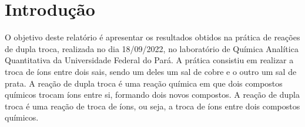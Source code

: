\documentclass[a4paper, 11pt]{article}
\begin{document}
\newpage
\section{Introdução}\label{sec:intro}
\indent O objetivo deste relatório é apresentar os resultados obtidos na prática de reações de dupla troca, realizada no dia 18/09/2022, no laboratório de Química Analítica Quantitativa da Universidade Federal do Pará.
    A prática consistiu em realizar a troca de íons entre dois sais, sendo um deles um sal de cobre e o outro um sal de prata. A reação de dupla troca é uma reação química em que dois compostos químicos trocam íons entre si, formando dois novos compostos. A reação de dupla troca é uma reação de troca de íons, ou seja, a troca de íons entre dois compostos químicos.
\end{document}
